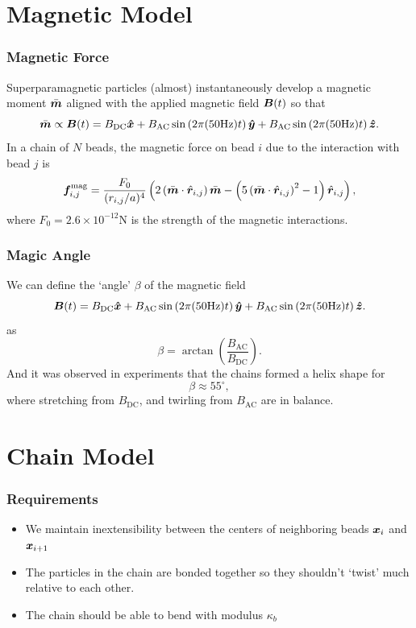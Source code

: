 \documentclass{beamer}
\begin{document}
\section{Magnetic Model}
\begin{frame}
\frametitle{Magnetic Force}
Superparamagnetic particles (almost) instantaneously develop a magnetic moment $\bar{\boldsymbol{m}}$ aligned with the applied magnetic field $\boldsymbol{B}(t)$ so that 
\[
\bar{\boldsymbol{m}} \propto \boldsymbol{B}(t) = B_{\text{DC}} \boldsymbol{\hat{x}} + B_{\text{AC}} \sin\left( 2 \pi (50 \text{Hz}) t \right) \boldsymbol{\hat{y}} + B_{\text{AC}} \sin\left( 2 \pi (50 \text{Hz}) t \right) \boldsymbol{\hat{z}}.
\]
In a chain of $N$ beads, the magnetic force on bead $i$ due to the interaction with bead $j$ is 
\begin{equation}
\boldsymbol{f}^{\text{mag}}_{i,j} = \frac{F_0}{(r_{i,j}/a)^{4}} \left( 2 \left( \bar{\boldsymbol{m}} \cdot \hat{\boldsymbol{r}}_{i,j} \right) \bar{\boldsymbol{m}} - \left( 5 \left( \bar{\boldsymbol{m}} \cdot \hat{\boldsymbol{r}}_{i,j} \right)^2 - 1 \right) \hat{\boldsymbol{r}}_{i,j} \right),
\end{equation}
where $F_0 = 2.6 \times 10^{-12}$N is the strength of the magnetic interactions. 
\end{frame}

\begin{frame}
\frametitle{Magic Angle}
We can define the `angle' $\beta$ of the magnetic field 
\[
\boldsymbol{B}(t) = B_{\text{DC}} \boldsymbol{\hat{x}} + B_{\text{AC}} \sin\left( 2 \pi (50 \text{Hz}) t \right) \boldsymbol{\hat{y}} + B_{\text{AC}} \sin\left( 2 \pi (50 \text{Hz}) t \right) \boldsymbol{\hat{z}}.
\]
as
\[
\beta = \arctan \left( \frac{B_{\text{AC}}}{B_{\text{DC}}} \right).
\]
And it was observed in experiments that the chains formed a helix shape for
\[
\beta \approx 55^{\circ},
\]
where stretching from $B_{\text{DC}}$, and twirling from $B_{\text{AC}}$ are in balance.
\end{frame}

\section{Chain Model}

\begin{frame}
\frametitle{Requirements}
\begin{itemize}
\item We maintain inextensibility between the centers of neighboring beads $\boldsymbol{x}_i$ and $\boldsymbol{x}_{i+1}$
\item The particles in the chain are bonded together so they shouldn't `twist' much relative to each other. 
\item The chain should be able to bend with modulus $\kappa_b$
\end{itemize}    
\end{frame}
\end{document}
